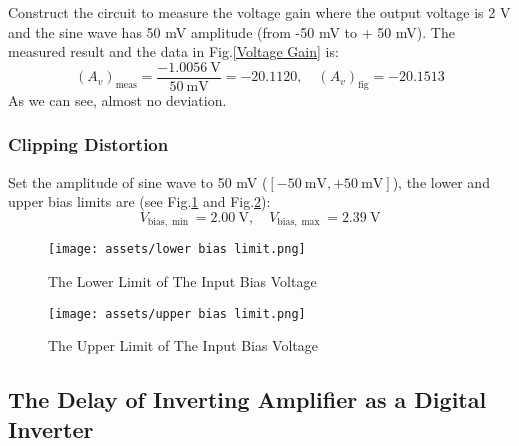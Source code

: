 \documentclass[UTF8]{report}
\theoremstyle{MyLineTheoremStyle} %
\theoremstyle{MyBlockTheoremStyle} %
\theoremstyle{MySubsubsectionStyle} %
\begin{document}
Construct the circuit to measure the voltage gain where the output voltage is 2 V and the sine wave has 50 mV amplitude (from -50 mV to + 50 mV). The measured result and the data in Fig.\ref{Voltage Gain} is:
\begin{equation}
\left(A_v\right)_{\text{meas}} = \frac{-1.0056 \ \mathrm{V}}{50 \ \mathrm{mV}} = -20.1120,\quad \left(A_v\right)_{\text{fig}}  = -20.1513
\end{equation}
As we can see, almost no deviation.

\subsubsection{Clipping Distortion}
Set the amplitude of sine wave to 50 mV ($[-50 \ \mathrm{mV}, +50 \ \mathrm{mV}]$), the lower and upper bias limits are (see Fig.\ref{The Lower Limit} and Fig.\ref{The Upper Limit}):
\begin{equation}
V_{\text{bias}, \min} = 2.00 \ \mathrm{V},\quad V_{\text{bias}, \max} = 2.39 \ \mathrm{V}
\end{equation}
\begin{figure}[H]\centering
    \texttt{[image: assets/lower bias limit.png]}
    \caption{The Lower Limit of The Input Bias Voltage}
    \label{The Lower Limit}
\end{figure}
\begin{figure}[H]\centering
    \texttt{[image: assets/upper bias limit.png]}
    \caption{The Upper Limit of The Input Bias Voltage}
    \label{The Upper Limit}
\end{figure}

\subsection{The Delay of Inverting Amplifier as a Digital Inverter}
\end{document}
